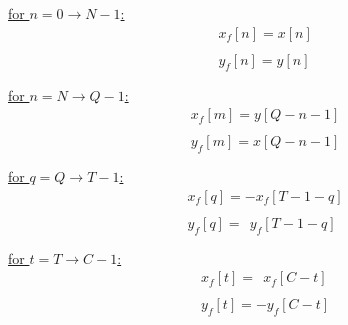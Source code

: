 \documentclass{article}
\begin{document}
\begin{enumerate}
          \underline{for $n = 0 \rightarrow N - 1$:} \\
            \begin{align*}
                &x_{f}[n] = x[n] \\ \\
                &y_{f}[n] = y[n] \\ \\
              \end{align*}
          \underline{for $n = N \rightarrow Q - 1$:} \\
            \begin{align*}
                &x_{f}[m] = y[Q - n - 1] \\ \\
                &y_{f}[m] = x[Q - n - 1] \\ \\
              \end{align*}
          \underline{for $q = Q \rightarrow T - 1$:} \\
             \begin{align*}
                &x_{f}[q] =    -x_{f}[T - 1 - q] \\ \\
                &y_{f}[q] = \ \ y_{f}[T - 1 - q] \\ \\
               \end{align*}
          \underline{for $t = T \rightarrow C - 1$:} \\
             \begin{align*}
                &x_{f}[t] = \ \ x_{f}[C - t] \\ \\
                &y_{f}[t] =    -y_{f}[C - t] \\ \\
               \end{align*}
\end{enumerate}
\end{document}
